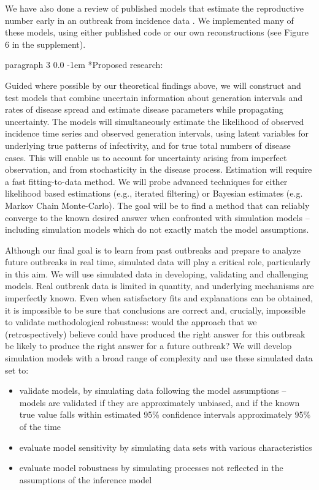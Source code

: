 \documentclass[12pt]{article}
\makeatletter
\renewcommand{\paragraph}{\vspace{0.40ex \@plus 0.2ex \@minus 0.0ex}\@startsection%
{paragraph}%
{3}%
{\parindent}%
{0.0\baselineskip}%
{-1em}%
{\normalfont\normalsize\bfseries}}%
\makeatother
\begin{document}
We have also done a review of published models that estimate the reproductive number early in an outbreak from incidence data \cite{ChampredonPoster}. We implemented many of these models, using either published code or our own reconstructions (see Figure 6 in the supplement).

\paragraph*{Proposed research:}

Guided where possible by our theoretical findings above, we will construct and test models that combine uncertain information about generation intervals and rates of disease spread and estimate disease parameters while propagating uncertainty. The models will simultaneously estimate the likelihood of observed incidence time series and observed generation intervals, using latent variables for underlying true patterns of infectivity, and for true total numbers of disease cases. This will enable us to account for uncertainty arising from imperfect observation, and from stochasticity in the disease process. Estimation will require a fast fitting-to-data method. We will probe advanced techniques for either likelihood based estimations (e.g., iterated filtering) or Bayesian estimates (e.g. Markov Chain Monte-Carlo). The goal will be to find a method that can reliably converge to the known desired answer when confronted with simulation models -- including simulation models which do not exactly match the model assumptions.

Although our final goal is to learn from past outbreaks and prepare to analyze future outbreaks in real time, simulated data will play a critical role, particularly in this aim. We will use simulated data in developing, validating and challenging models. Real outbreak data is limited in quantity, and underlying mechanisms are imperfectly known. Even when satisfactory fits and explanations can be obtained, it is impossible to be sure that conclusions are correct and, crucially, impossible to validate methodological robustness: would the approach that we (retrospectively) believe could have produced the right answer for this outbreak be likely to produce the right answer for a future outbreak? We will develop simulation models with a broad range of complexity and use these simulated data set to:

\begin{itemize}

\item validate models, by simulating data following the model assumptions -- models are validated if they are approximately unbiased, and if the known true value falls within estimated 95\% confidence intervals approximately 95\% of the time

\item evaluate model sensitivity by simulating data sets with various characteristics

\item evaluate model robustness by simulating processes not reflected in the assumptions of the inference model

\end{itemize}
\end{document}
